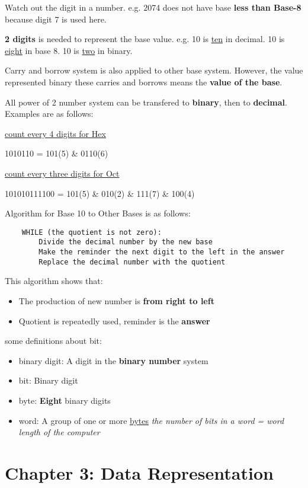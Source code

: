 \documentclass[12pt]{article}
\begin{document}
Watch out the digit in a number. e.g. 2074 does not have base \textbf{less than Base-8}
because digit 7 is used here.

\textbf{2 digits} is needed to represent the base value. e.g. 10 is \underline{ten} in decimal.
10 is \underline{eight} in base 8. 10 is \underline{two} in binary.

Carry and borrow system is also applied to other base system. However, the value represented binary
these carries and borrows means the \textbf{value of the base}.

All power of 2 number system can be transfered to \textbf{binary}, then to \textbf{decimal}.
Examples are as follows:
\begin{center}
\underline{count every 4 digits for Hex}

1010110 = 101(5) \& 0110(6)  

\underline{count every three digits for Oct}

101010111100 = 101(5) \& 010(2) \& 111(7) \& 100(4)
\end{center}

Algorithm for Base 10 to Other Bases is as follows:
\begin{lstlisting}
    WHILE (the quotient is not zero):
        Divide the decimal number by the new base
        Make the reminder the next digit to the left in the answer
        Replace the decimal number with the quotient
\end{lstlisting}    
This algorithm shows that:
\begin{itemize}
    \item The production of new number is \textbf{from right to left}    
    \item Quotient is repeatedly used, reminder is the \textbf{answer}
\end{itemize}

some definitions about bit:
\begin{itemize}
    \item binary digit: A digit in the \textbf{binary number} system
    \item bit: Binary digit
    \item byte: \textbf{Eight} binary digits
    \item word: A group of one or more \underline{bytes} \newline
    \emph{the number of bits in a word = word length of the computer}
\end{itemize}

\section{Chapter 3: Data Representation}
\end{document}
